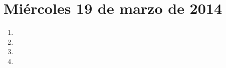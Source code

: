 \documentclass[11pt,spanish]{article}
\begin{document}
  \thispagestyle{empty}
  \section*{Miércoles 19 de marzo de 2014}

  \begin{enumerate}[font=\Large\bfseries]
    \item
      
    \item
      
    \item
      
    \item
      
  \end{enumerate}
\end{document}
